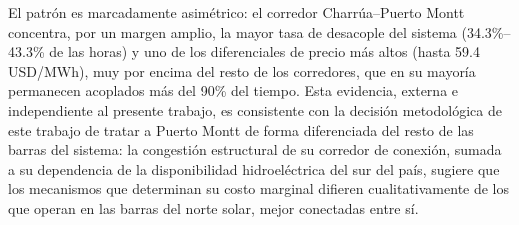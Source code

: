 \begin{table}[htbp]
    \centering
    \small
    \caption{Porcentaje de horas con desacople de costo marginal ($\geq$7\%) y diferencial promedio de precio ($\Delta$SMP) entre barras vecinas, para los corredores de transmisión del SEN durante enero y julio de 2024. Fuente: León et al. (2026) \cite{LeonSMPChile}, a partir de datos del Coordinador Eléctrico Nacional. Alto Jahuel es un nodo intermedio entre Quillota y Charrúa que no forma parte de las ocho barras estudiadas en este trabajo.}
    \label{tab:congestion_corredores}
\end{table}

El patrón es marcadamente asimétrico: el corredor Charrúa--Puerto Montt concentra, por un margen amplio, la mayor tasa de desacople del sistema (34.3\%--43.3\% de las horas) y uno de los diferenciales de precio más altos (hasta 59.4 USD/MWh), muy por encima del resto de los corredores, que en su mayoría permanecen acoplados más del 90\% del tiempo. Esta evidencia, externa e independiente al presente trabajo, es consistente con la decisión metodológica de este trabajo de tratar a Puerto Montt de forma diferenciada del resto de las barras del sistema: la congestión estructural de su corredor de conexión, sumada a su dependencia de la disponibilidad hidroeléctrica del sur del país, sugiere que los mecanismos que determinan su costo marginal difieren cualitativamente de los que operan en las barras del norte solar, mejor conectadas entre sí.

